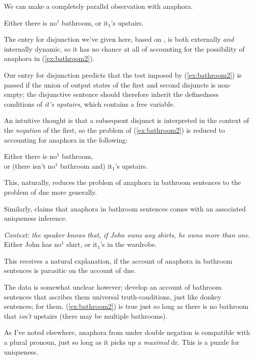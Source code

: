 \documentclass[nols,twoside,nofonts,nobib,nohyper]{tufte-handout}
\theoremstyle{definition}
\begin{document}
We can make a completely parallel observation with anaphora.

\ex
Either there is no$^{1}$ bathroom, or it$_{1}$'s upstairs.\label{ex:bathroom2}
\xe

The entry for disjunction we've given here, based on \citet{GroenendijkStokhof1991}, is both externally \textit{and} internally dynamic, so it has no chance at all of accounting for the possibility of anaphora in (\ref{ex:bathroom2}).

Our entry for disjunction predicts that the test imposed by (\ref{ex:bathroom2}) is passed if the union of output states of the first and second disjuncts is non-empty; the disjunctive sentence should therefore inherit the definedness conditions of \textit{it's upstairs}, which contains a free variable.

An intuitive thought is that a subsequent disjunct is interpreted in the context of the \textit{negation} of the first, so the problem of (\ref{ex:bathroom2}) is reduced to accounting for anaphora in the following:

\ex
Either there is no$^{1}$ bathroom,\\
or (there isn't no$^{1}$ bathroom and) it$_{1}$'s upstairs.
\xe

This, naturally, reduces the problem of anaphora in bathroom sentences to the problem of \ac{dne} more generally.

Similarly, \citet{Gotham2019} claims that anaphora in bathroom sentences comes with an associated uniqueness inference.

\ex \textit{Context: the speaker knows that, if John owns any shirts, he owns more than one.}\\
Either John has no$^{1}$ shirt, or it$_{1}$'s in the wardrobe.
\xe

This receives a natural explanation, if the account of anaphora in bathroom sentences is parasitic on the account of \ac{dne}.

The data is somewhat unclear however; \citet{KrahmerMuskens1995} develop an account of bathroom sentences that ascribes them universal truth-conditions, just like donkey sentences; for them, (\ref{ex:bathroom2}) is true just so long as there is no bathroom that \textit{isn't} upstairs (there may be multiple bathrooms).

As I've noted elsewhere, anaphora from under double negation is compatible with a plural pronoun, just so long as it picks up a \textit{maximal} \ac{dr}. This is a puzzle for uniqueness.
\end{document}
